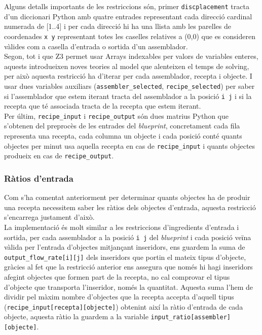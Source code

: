Alguns detalls importants de les restriccions són, primer \texttt{discplacement} tracta d'un diccionari Python amb quatre entrades representant cada direcció cardinal numerada de [1..4] i per cada direcció hi ha una llista amb les parelles de coordenades \texttt{x y} representant totes les caselles relatives a (0,0) que es consideren vàlides com a casella d'entrada o sortida d'un assemblador.\\
Segon, tot i que Z3 permet usar Arrays indexables per valors de variables enteres, aquests introdueixen noves teories al model que alenteixen el temps de solving, per això aquesta restricció ha d'iterar per cada assemblador, recepta i objecte. I usar dues variables auxiliars (\texttt{assembler\_selected}, \texttt{recipe\_selected}) per saber si l'assemblador que estem iterant tracta del assemblador a la posició \texttt{i j} i si la recepta que té associada tracta de la recepta que estem iterant.\\
Per últim, \texttt{recipe\_input} i \texttt{recipe\_output} són dues matrius Python que s'obtenen del preprocès de les entrades del \textit{blueprint}, concretament cada fila representa una recepta, cada columna un objecte i cada posició conté quants objectes per minut usa aquella recepta en cas de \texttt{recipe\_input} i quants objectes produeix en cas de \texttt{recipe\_output}.

\subsubsection{Ràtios d'entrada}
Com s'ha comentat anteriorment per determinar quants objectes ha de produir una recepta necessitem saber les ràtios dels objectes d'entrada, aquesta restricció s'encarrega justament d'això.\\
La implementació és molt similar a les restriccions d'ingredients d'entrada i sortida, per cada assemblador a la posició \texttt{i j} del \textit{blueprint} i cada posició veïna vàlida per l'entrada d'objectes mitjançant inseridors, ens guardem la suma de \texttt{output\_flow\_rate[i][j]} dels inseridors que portin el mateix tipus d'objecte, gràcies al fet que la restricció anterior ens assegura que només hi hagi inseridors afegint objectes que formen part de la recepta, no cal comprovar el tipus d'objecte que transporta l'inseridor, només la quantitat. Aquesta suma l'hem de dividir pel màxim nombre d'objectes que la recepta accepta d'aquell tipus (\texttt{recipe\_input[recepta][objecte]}) obtenint així la ràtio d'entrada de cada objecte, aquesta ràtio la guardem a la variable \texttt{input\_ratio[assembler][objecte]}.

